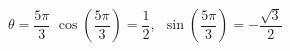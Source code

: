 {$\theta = \dfrac{5\pi}{3}$}
{$\cos\left(\dfrac{5\pi}{3}\right) = \dfrac{1}{2}$, $\; \sin \left(\dfrac{5\pi}{3}\right) = -\dfrac{\sqrt{3}}{2}$}
